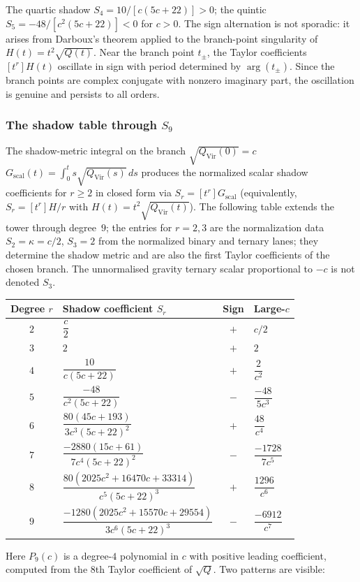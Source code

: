 \begin{remark}
\label{rem:darboux-sign}%
%
%
The quartic shadow $S_4 = 10/[c(5c+22)] > 0$; the quintic
$S_5 = -48/[c^2(5c+22)] < 0$ for $c > 0$. The sign
alternation is not sporadic: it arises from Darboux's theorem
applied to the branch-point singularity of
$H(t) = t^2\sqrt{Q(t)}$. Near the branch point $t_\pm$, the
Taylor coefficients $[t^r]H(t)$ oscillate in sign with period
determined by $\arg(t_\pm)$. Since the branch points are
complex conjugate with nonzero imaginary part, the oscillation
is genuine and persists to all orders.
\end{remark}

\subsubsection*{The shadow table through $S_9$}

The shadow-metric integral on the branch
\(\sqrt{Q_{\mathrm{Vir}}(0)}=c\)
$G_{\mathrm{scal}}(t) = \int_0^t s\sqrt{Q_{\mathrm{Vir}}(s)}\,ds$
produces the normalized scalar shadow coefficients for $r \ge 2$ in closed form via
$S_r = [t^r]G_{\mathrm{scal}}$ (equivalently, $S_r = [t^r]H/r$
with $H(t) = t^2\sqrt{Q_{\mathrm{Vir}}(t)}$).
The following table extends the tower through degree~$9$;
the entries for $r = 2,3$ are the normalization data
$S_2 = \kappa = c/2$, $S_3=2$ from the normalized binary and ternary
lanes; they determine the shadow metric and are also the first Taylor
coefficients of the chosen branch. The unnormalised gravity ternary
scalar proportional to $-c$ is not denoted $S_3$.

\begin{center}
\small
\renewcommand{\arraystretch}{1.3}
\begin{tabular}{@{}clcl@{}}
\textbf{Degree $r$}
 & \textbf{Shadow coefficient $S_r$}
 & \textbf{Sign}
 & \textbf{Large-$c$} \\
\hline
$2$ & $\dfrac{c}{2}$ & $+$ & $c/2$ \\[6pt]
$3$ & $2$ & $+$ & $2$ \\[4pt]
$4$ & $\dfrac{10}{c(5c+22)}$ & $+$ & $\dfrac{2}{c^2}$ \\[6pt]
$5$ & $\dfrac{-48}{c^2(5c+22)}$ & $-$
 & $\dfrac{-48}{5c^3}$ \\[6pt]
$6$ & $\dfrac{80(45c+193)}{3c^3(5c+22)^2}$ & $+$
 & $\dfrac{48}{c^4}$ \\[6pt]
$7$ & $\dfrac{-2880(15c + 61)}
 {7c^4(5c+22)^2}$ & $-$
 & $\dfrac{-1728}{7c^5}$ \\[6pt]
$8$ & $\dfrac{80(2025c^2 + 16470c + 33314)}
 {c^5(5c+22)^3}$ & $+$
 & $\dfrac{1296}{c^6}$ \\[6pt]
$9$ & $\dfrac{-1280(2025c^2 + 15570c + 29554)}{3c^6(5c+22)^3}$ & $-$
 & $\dfrac{-6912}{c^7}$
\end{tabular}
\end{center}
\noindent
Here $P_9(c)$ is a degree-$4$ polynomial in $c$ with positive
leading coefficient, computed from the $8$th Taylor coefficient of
$\sqrt{Q}$. Two patterns are visible:

